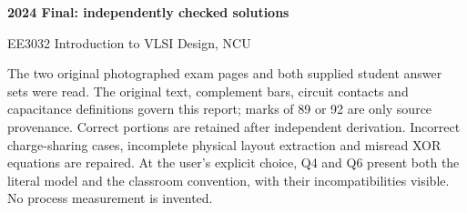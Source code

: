 \documentclass[10pt]{article}
\begin{document}
\begin{center}{\Large\bfseries 2024 Final: independently checked solutions}\par EE3032 Introduction to VLSI Design, NCU\end{center}
The two original photographed exam pages and both supplied student answer sets were read. The original text, complement bars, circuit contacts and capacitance definitions govern this report; marks of 89 or 92 are only source provenance. Correct portions are retained after independent derivation. Incorrect charge-sharing cases, incomplete physical layout extraction and misread XOR equations are repaired. At the user's explicit choice, Q4 and Q6 present both the literal model and the classroom convention, with their incompatibilities visible. No process measurement is invented.
\end{document}
